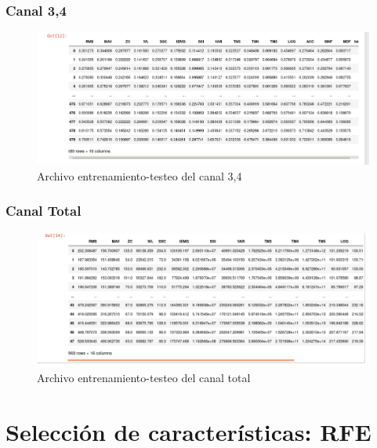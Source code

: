     \subsubsection{Canal 3,4}
        \begin{figure}[ht]
            \centering
            \includegraphics[width=1.0\textwidth]{imagenes/datos canal 34.png}
            \caption{Archivo entrenamiento-testeo del canal 3,4}
            \label{fig:archivo34}
        \end{figure}
        
        
        \newpage
    \subsubsection{Canal Total}
        \begin{figure}[ht]
            \centering
            \includegraphics[width=1.0\textwidth]{imagenes/datos canal total.png}
            \caption{Archivo entrenamiento-testeo del canal total}
            \label{fig:archivototal}
        \end{figure}


\section{Selección de características: RFE \label{anexo rfe}}
	
